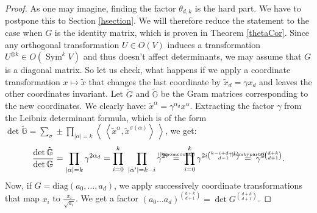 \documentclass{amsart}
\DeclareMathOperator{\Sym}{Sym}
\newcommand{\bra}{\left<\!\!\!\:\left<}
\newcommand{\ket}{\right>\!\!\!\:\right>}
\newcommand{\myeq}[1]{\mathrel{\overset{\makebox[0pt]{\text{\tiny #1}}}{=}}}
\newcommand{\G}{\mathbb{G}}
\theoremstyle{plain}
\theoremstyle{definition}
\theoremstyle{remark}
\begin{document}
\begin{proof}
As one may imagine, finding the factor $\theta_{d,k}$ is the hard part. We have to postpone this to Section \ref{hsection}. We will therefore reduce the statement to the case when $G$ is the identity matrix, which is proven in Theorem \ref{thetaCor}. Since any orthogonal transformation $U\in O(V)$ induces a  transformation $U^{\otimes k} \in O(\Sym^k V)$ and thus doesn't affect determinants, we may assume that $G$ is a diagonal matrix. So let us check, what happens if we apply a coordinate transformation $x\mapsto\tilde x$ that changes the last coordinate by $\tilde{x}_d = \gamma x_d$ and leaves the other coordinates invariant. Let $\tilde{G}$ and $\tilde{\G}$ be the Gram matrices corresponding to the new coordinates. We clearly have: $\tilde{x}^\alpha = \gamma^{\alpha_d} x^\alpha$. Extracting the factor $\gamma$ from the Leibniz determinant formula, which is of the form $\det \tilde{\G}=\sum\limits_\sigma\pm\prod\limits_{|\alpha|=k} \bra \tilde{x}^{\alpha},\tilde{x}^{\sigma(\alpha)}\ket$, we get: 
\vspace{-2mm}
$$
\frac{\det \tilde{\G}}{\det\G} = \prod_{|\alpha|=k}\gamma^{2\alpha_d} = \prod_{i=0}^k\ \prod_{|\alpha '|=k-i} \gamma^{2i} \; \myeq{(\ref{binomcount})}\;\prod_{i=0}^k\gamma^{2i\binom{k-i+d-1}{d-1}} \; \myeq{(\ref{sumbyparts})} \; \gamma^{2\binom{d+k}{d+1}}.
$$
Now, if $G= \text{diag}\left(a_0,\ldots,a_d\right)$, we apply successively coordinate transformations that map $x_i$ to $\frac{x_i}{\sqrt{a_i}}$. We get a factor $(a_0\ldots a_d)^{\binom{d+k}{d+1}} = \det G^{\binom{d+k}{d+1}}$.
\end{proof}
\end{document}
